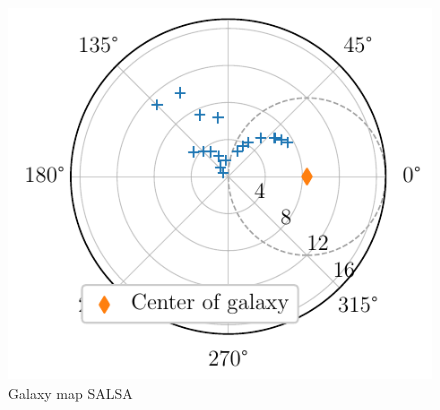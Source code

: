 \begin{figure}[htbp]
\begin{minipage}[t]{0.5\textwidth}
        \includegraphics[scale=1]{figures/SALSA_galaxy_map.pdf}
        \caption{Galaxy map SALSA}
        \label{fig:SALSA_galaxy_map}
    \end{minipage}
\end{figure}